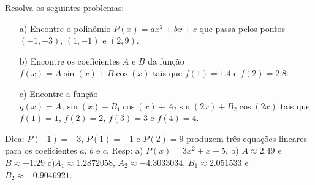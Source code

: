 \begin{Exercise}[title= Interpolação] Resolva os seguintes problemas:
\begin{itemize}
\item[a)] Encontre o polinômio $P(x)=ax^2+bx+c$ que passa pelos pontos $(-1,-3)$, $(1,-1)$ e $(2,9)$.
\item[b)] Encontre os coeficientes $A$ e $B$ da função $f(x)=A\sin(x)+B\cos(x)$ tais que $f(1)=1.4$ e $f(2)=2.8$.
\item[c)] Encontre a função $g(x)=A_1\sin(x)+B_1\cos(x) + A_2\sin(2x)+B_2\cos(2x)$ tais que $f(1)=1$, $f(2)=2$, $f(3)=3$ e $f(4)=4$.
\end{itemize}
\end{Exercise}
\begin{Answer}
Dica: $P(-1)=-3$, $P(1)=-1$ e $P(2)=9$ produzem três equações lineares para os coeficientes $a$, $b$ e $c$.
Resp: a) $P(x)=3x^2+x-5$, b) $A\approx 2.49$ e $B\approx -1.29$ c)$A_1\approx 1.2872058$, $A_2\approx - 4.3033034$, $B_1\approx 2.051533$ e $B_2\approx - 0.9046921$.
\end{Answer}


%

